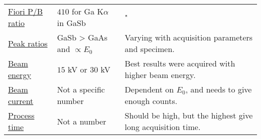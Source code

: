 \begin{table}[hbpt]
\begin{center}
\begin{tabular}{p{2.5cm}p{4cm}p{7cm}}
            \hyperref[results:fiori]{Fiori P/B ratio}                     & $410$ for Ga K$\alpha$ in GaSb & "                                                                                                                                                                                                      \\
            \hyperref[results:peak_ratios]{Peak ratios}                   & GaSb > GaAs and $\propto E_0$  & Varying with acquisition parameters and specimen.                                                                                                                                                      \\
            \hline%
            \hyperref[results:beam_energy_and_beam_current]{Beam energy}  & $15$ kV or $30$ kV             & Best results were acquired with higher beam energy.                                                                                                                                                    \\
            \hyperref[results:beam_energy_and_beam_current]{Beam current} & Not a specific number          & Dependent on $E_0$, and needs to give enough counts.                                                                                                                                                   \\
            \hyperref[results:process_time]{Process time}                 & Not a number                   & Should be high, but the highest give long acquisition time.                                                                                                                                            \\
            \hline
        \end{tabular}
    \end{center}
\end{table}
